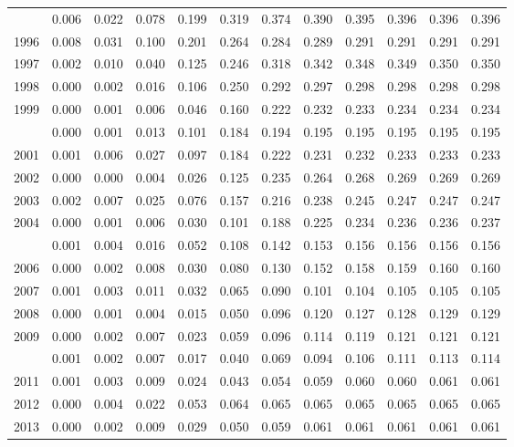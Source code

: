 \documentclass[
]{article}
\begin{document}
\begin{longtable}[t]{lrrrrrrrrrrr}
\addlinespace
1995 & 0.006 & 0.022 & 0.078 & 0.199 & 0.319 & 0.374 & 0.390 & 0.395 & 0.396 & 0.396 & 0.396\\
1996 & 0.008 & 0.031 & 0.100 & 0.201 & 0.264 & 0.284 & 0.289 & 0.291 & 0.291 & 0.291 & 0.291\\
1997 & 0.002 & 0.010 & 0.040 & 0.125 & 0.246 & 0.318 & 0.342 & 0.348 & 0.349 & 0.350 & 0.350\\
1998 & 0.000 & 0.002 & 0.016 & 0.106 & 0.250 & 0.292 & 0.297 & 0.298 & 0.298 & 0.298 & 0.298\\
1999 & 0.000 & 0.001 & 0.006 & 0.046 & 0.160 & 0.222 & 0.232 & 0.233 & 0.234 & 0.234 & 0.234\\
\addlinespace
2000 & 0.000 & 0.001 & 0.013 & 0.101 & 0.184 & 0.194 & 0.195 & 0.195 & 0.195 & 0.195 & 0.195\\
2001 & 0.001 & 0.006 & 0.027 & 0.097 & 0.184 & 0.222 & 0.231 & 0.232 & 0.233 & 0.233 & 0.233\\
2002 & 0.000 & 0.000 & 0.004 & 0.026 & 0.125 & 0.235 & 0.264 & 0.268 & 0.269 & 0.269 & 0.269\\
2003 & 0.002 & 0.007 & 0.025 & 0.076 & 0.157 & 0.216 & 0.238 & 0.245 & 0.247 & 0.247 & 0.247\\
2004 & 0.000 & 0.001 & 0.006 & 0.030 & 0.101 & 0.188 & 0.225 & 0.234 & 0.236 & 0.236 & 0.237\\
\addlinespace
2005 & 0.001 & 0.004 & 0.016 & 0.052 & 0.108 & 0.142 & 0.153 & 0.156 & 0.156 & 0.156 & 0.156\\
2006 & 0.000 & 0.002 & 0.008 & 0.030 & 0.080 & 0.130 & 0.152 & 0.158 & 0.159 & 0.160 & 0.160\\
2007 & 0.001 & 0.003 & 0.011 & 0.032 & 0.065 & 0.090 & 0.101 & 0.104 & 0.105 & 0.105 & 0.105\\
2008 & 0.000 & 0.001 & 0.004 & 0.015 & 0.050 & 0.096 & 0.120 & 0.127 & 0.128 & 0.129 & 0.129\\
2009 & 0.000 & 0.002 & 0.007 & 0.023 & 0.059 & 0.096 & 0.114 & 0.119 & 0.121 & 0.121 & 0.121\\
\addlinespace
2010 & 0.001 & 0.002 & 0.007 & 0.017 & 0.040 & 0.069 & 0.094 & 0.106 & 0.111 & 0.113 & 0.114\\
2011 & 0.001 & 0.003 & 0.009 & 0.024 & 0.043 & 0.054 & 0.059 & 0.060 & 0.060 & 0.061 & 0.061\\
2012 & 0.000 & 0.004 & 0.022 & 0.053 & 0.064 & 0.065 & 0.065 & 0.065 & 0.065 & 0.065 & 0.065\\
2013 & 0.000 & 0.002 & 0.009 & 0.029 & 0.050 & 0.059 & 0.061 & 0.061 & 0.061 & 0.061 & 0.061\\

\end{longtable}
\end{document}
